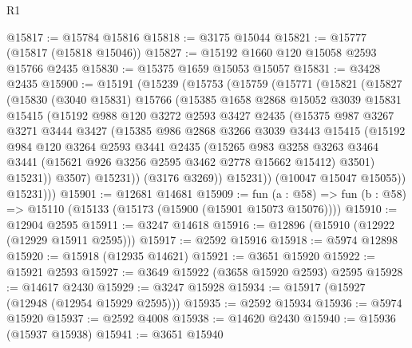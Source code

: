 \begin{lexlean}{R1}
\begin{coremodule}
@15817 := @15784 @15816
@15818 := @3175 @15044
@15821 := @15777 (@15817 (@15818 @15046))
@15827 := @15192 @1660 @120 @15058 @2593 @15766 @2435
@15830 := @15375 @1659 @15053 @15057
@15831 := @3428 @2435
@15900 := @15191
    (@15239
      (@15753
        (@15759
          (@15771
            (@15821
              (@15827
                (@15830
                  (@3040 @15831)
                  @15766
                  (@15385
                    @1658
                    @2868
                    @15052
                    @3039
                    @15831
                    @15415
                    (@15192
                      @988
                      @120
                      @3272
                      @2593
                      @3427
                      @2435
                      (@15375
                        @987
                        @3267
                        @3271
                        @3444
                        @3427
                        (@15385
                          @986
                          @2868
                          @3266
                          @3039
                          @3443
                          @15415
                          (@15192
                            @984
                            @120
                            @3264
                            @2593
                            @3441
                            @2435
                            (@15265
                              @983
                              @3258
                              @3263
                              @3464
                              @3441
                              (@15621 @926 @3256 @2595 @3462 @2778 @15662 @15412)
                              @3501)
                            @15231))
                        @3507)
                      @15231))
                  (@3176 @3269))
                @15231))
            (@10047 @15047 @15055))
          @15231)))
@15901 := @12681 @14681
@15909 := fun (a : @58) => fun (b : @58) => @15110 (@15133 (@15173 (@15900 (@15901 @15073 @15076))))
@15910 := @12904 @2595
@15911 := @3247 @14618
@15916 := @12896 (@15910 (@12922 (@12929 @15911 @2595)))
@15917 := @2592 @15916
@15918 := @5974 @12898
@15920 := @15918 (@12935 @14621)
@15921 := @3651 @15920
@15922 := @15921 @2593
@15927 := @3649 @15922 (@3658 @15920 @2593) @2595
@15928 := @14617 @2430
@15929 := @3247 @15928
@15934 := @15917 (@15927 (@12948 (@12954 @15929 @2595)))
@15935 := @2592 @15934
@15936 := @5974 @15920
@15937 := @2592 @4008
@15938 := @14620 @2430
@15940 := @15936 (@15937 @15938)
@15941 := @3651 @15940

\end{coremodule}
\end{lexlean}
